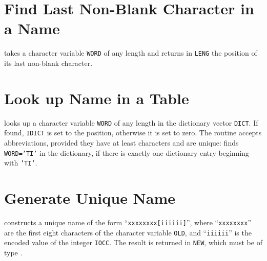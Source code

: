 \section{Find Last Non-Blank Character in a Name}
\label{UTLENG}
takes a character variable {\tt WORD} of any length and returns
in {\tt LENG} the position of its last non-blank character.

\section{Look up Name in a Table}
\label{UTLOOK}
looks up a character variable {\tt WORD} of any length in the
dictionary vector {\tt DICT}.
If found, {\tt IDICT} is set to the position,
otherwise it is set to zero.
The routine accepts abbreviations, provided they have at least
characters and are unique:
finds {\tt WORD='TI'} in the dictionary,
if there is exactly one dictionary entry beginning with {\tt 'TI'}.

\section{Generate Unique Name}
\label{UTOCNM}
constructs a unique name of the form ``{\tt xxxxxxxx[iiiiii]}'',
where ``{\tt xxxxxxxx}'' are the first eight characters
of the character variable {\tt OLD},
and ``{\tt iiiiii}'' is the encoded value of the integer {\tt IOCC}.
The result is returned in {\tt NEW},
which must be of type .

